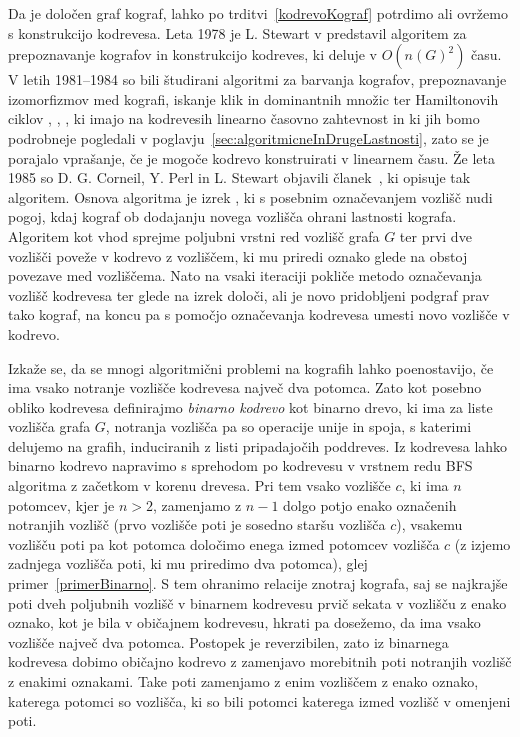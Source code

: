\documentclass[12pt,a4paper,twoside]{article}
\theoremstyle{definition} %
\theoremstyle{plain} %
\numberwithin{equation}{section}  %
\begin{document}
Da je določen graf kograf, lahko po trditvi~\ref{kodrevoKograf} potrdimo ali ovržemo s konstrukcijo kodrevesa. Leta 1978 je L. Stewart v \cite{stewart1978cographs} predstavil algoritem za prepoznavanje kografov in konstrukcijo kodreves, ki deluje v $O(n(G)^2)$ času. V letih 1981--1984 so bili študirani algoritmi za barvanja kografov, prepoznavanje izomorfizmov med kografi, iskanje klik in dominantnih množic ter Hamiltonovih ciklov \cite{corneil1981complement}, \cite{corneil1984clustering}, \cite{corneil1984cographs}, ki imajo na kodrevesih linearno časovno zahtevnost in ki jih bomo podrobneje pogledali v poglavju~\ref{sec:algoritmicneInDrugeLastnosti}, zato se je porajalo vprašanje, če je mogoče kodrevo konstruirati v linearnem času. Že leta 1985 so D. G. Corneil, Y. Perl in L. Stewart objavili članek~\cite{corneil1985linear}, ki opisuje tak algoritem. Osnova algoritma je izrek \cite[Theorem 1]{corneil1985linear}, ki s posebnim označevanjem vozlišč nudi pogoj, kdaj kograf ob dodajanju novega vozlišča ohrani lastnosti kografa. Algoritem \cite[Algorithm Cograph-recognition]{corneil1985linear} kot vhod sprejme poljubni vrstni red vozlišč grafa $G$ ter prvi dve vozlišči poveže v kodrevo z vozliščem, ki mu priredi oznako glede na obstoj povezave med vozliščema. Nato na vsaki iteraciji pokliče metodo označevanja vozlišč kodrevesa ter glede na izrek \cite[Theorem 1]{corneil1985linear} določi, ali je novo pridobljeni podgraf prav tako kograf, na koncu pa s pomočjo označevanja kodrevesa umesti novo vozlišče v kodrevo.

\medskip
Izkaže se, da se mnogi algoritmični problemi na kografih lahko poenostavijo, če ima vsako notranje vozlišče kodrevesa največ dva potomca. Zato kot posebno obliko kodrevesa definirajmo \emph{binarno kodrevo} kot binarno drevo, ki ima za liste vozlišča grafa $G$, notranja vozlišča pa so operacije unije in spoja, s katerimi delujemo na grafih, induciranih z listi pripadajočih poddreves. Iz kodrevesa lahko binarno kodrevo napravimo s sprehodom po kodrevesu v vrstnem redu BFS algoritma z začetkom v korenu drevesa. Pri tem vsako vozlišče $c$, ki ima $n$ potomcev, kjer je $n > 2$, zamenjamo z $n-1$ dolgo potjo enako označenih notranjih vozlišč (prvo vozlišče poti je sosedno staršu vozlišča $c$), vsakemu vozlišču poti pa kot potomca določimo enega izmed potomcev vozlišča $c$ (z izjemo zadnjega vozlišča poti, ki mu priredimo dva potomca), glej primer~\ref{primerBinarno}. S tem ohranimo relacije znotraj kografa, saj se najkrajše poti dveh poljubnih vozlišč v binarnem kodrevesu prvič sekata v vozlišču z enako oznako, kot je bila v običajnem kodrevesu, hkrati pa dosežemo, da ima vsako vozlišče največ dva potomca. Postopek je reverzibilen, zato iz binarnega kodrevesa dobimo običajno kodrevo z zamenjavo morebitnih poti notranjih vozlišč z enakimi oznakami. Take poti zamenjamo z enim vozliščem z enako oznako, katerega potomci so vozlišča, ki so bili potomci katerega izmed vozlišč v omenjeni poti.
\end{document}
